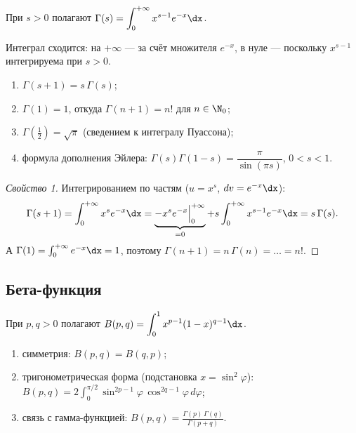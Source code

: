 \begin{definition}
При $s>0$ полагают $\displaystyle\Gamma(s)=\int_0^{+\infty}x^{s-1}e^{-x}\dx$.
\end{definition}

Интеграл сходится: на $+\infty$ — за счёт множителя $e^{-x}$, в нуле — поскольку $x^{s-1}$
интегрируема при $s>0$.

\begin{property}\leavevmode
\begin{enumerate}[label=\arabic*),leftmargin=*]
  \item $\Gamma(s+1)=s\,\Gamma(s)$;
  \item $\Gamma(1)=1$, откуда $\Gamma(n+1)=n!$ для $n\in\N_0$;
  \item $\Gamma\!\left(\tfrac12\right)=\sqrt\pi$ (сведением к интегралу Пуассона);
  \item формула дополнения Эйлера: $\Gamma(s)\Gamma(1-s)=\dfrac{\pi}{\sin(\pi s)}$, $0<s<1$.
\end{enumerate}
\end{property}

\begin{proof}[Свойство 1]
Интегрированием по частям ($u=x^s$, $dv=e^{-x}\dx$):
\[
  \Gamma(s+1)=\int_0^{+\infty}x^s e^{-x}\dx
   =\underbrace{-x^s e^{-x}\Big|_0^{+\infty}}_{=0}+s\int_0^{+\infty}x^{s-1}e^{-x}\dx=s\,\Gamma(s).
\]
А $\Gamma(1)=\int_0^{+\infty}e^{-x}\dx=1$, поэтому $\Gamma(n+1)=n\,\Gamma(n)=\dots=n!$.
\end{proof}

\subsection{Бета-функция}

\begin{definition}
При $p,q>0$ полагают $\displaystyle B(p,q)=\int_0^1 x^{p-1}(1-x)^{q-1}\dx$.
\end{definition}

\begin{property}\leavevmode
\begin{enumerate}[label=\arabic*),leftmargin=*]
  \item симметрия: $B(p,q)=B(q,p)$;
  \item тригонометрическая форма (подстановка $x=\sin^2\varphi$):
        $\displaystyle B(p,q)=2\int_0^{\pi/2}\sin^{2p-1}\varphi\,\cos^{2q-1}\varphi\,d\varphi$;
  \item связь с гамма-функцией: $\displaystyle B(p,q)=\frac{\Gamma(p)\,\Gamma(q)}{\Gamma(p+q)}$.
\end{enumerate}
\end{property}
